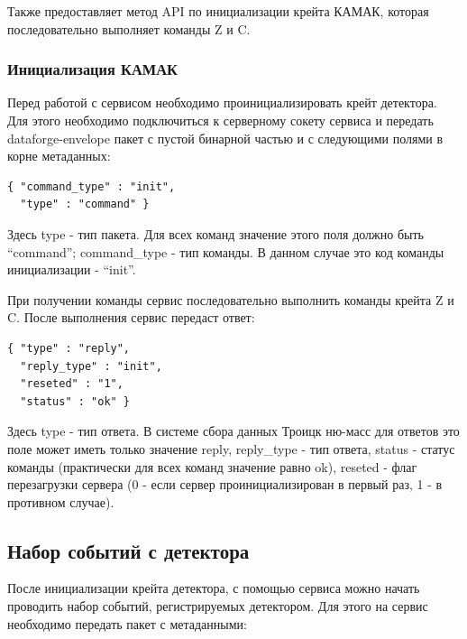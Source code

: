 \documentclass[a4paper,14pt]{extreport}
\begin{document}
\bigskip

Также предоставляет метод API по инициализации крейта КАМАК, которая последовательно выполняет команды Z и C.

\subsubsection{Инициализация КАМАК}

Перед работой с сервисом необходимо проинициализировать крейт детектора. Для этого необходимо подключиться к серверному сокету сервиса и передать dataforge-envelope пакет с пустой бинарной частью и с следующими полями в корне метаданных:

\begin{lstlisting}[caption={Команда иниализации крейта КАМАК детектора.}, captionpos=b]
{ "command_type" : "init",
  "type" : "command" }
\end{lstlisting}

Здесь type - тип пакета. Для всех команд значение этого поля должно быть “command”; command\_type - тип команды. В данном случае это код команды инициализации - “init”.

При получении команды сервис последовательно выполнить команды крейта Z и C. После выполнения сервис передаст ответ:

\begin{lstlisting}[caption={Сообщение об успешной иниализации сервиса детектора.}, captionpos=b]
{ "type" : "reply",
  "reply_type" : "init",
  "reseted" : "1",
  "status" : "ok" }
\end{lstlisting}

Здесь type - тип ответа. В системе сбора данных Троицк ню-масс для ответов это поле может иметь только значение reply, reply\_type - тип ответа, status - статус команды (практически для всех команд значение равно ok), reseted - флаг перезагрузки сервера (0 - если сервер проинициализирован в первый раз, 1 - в противном случае).

\subsection{Набор событий с детектора}

После инициализации крейта детектора, с помощью сервиса можно начать проводить набор событий, регистрируемых детектором. Для этого на сервис необходимо передать пакет с метаданными:
\end{document}
